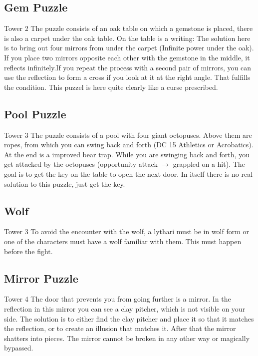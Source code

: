 \documentclass[a4paper,10pt,twoside,twocolumn,bg=print]{dndbook} %
\begin{document}
		\subsection{Gem Puzzle}
			Tower 2\linebreak
			The puzzle consists of an oak table on which a gemstone is placed, there is also a carpet under the oak table. On the table is a writing:  The solution here is to bring out four mirrors from under the carpet (Infinite power under the oak). If you place two mirrors opposite each other with the gemstone in the middle, it reflects infinitely.If you repeat the process with a second pair of mirrors, you can use the reflection to form a cross if you look at it at the right angle. That fulfills the condition. This puzzel is here quite clearly like a curse prescribed.
		\subsection{Pool Puzzle}
			Tower 3\linebreak
			The puzzle consists of a pool with four giant octopuses. Above them are ropes, from which you can swing back and forth (DC 15 Athletics or Acrobatics). At the end is a improved bear trap. While you are swinging back and forth, you get attacked by the octopuses (opportunity attack $\rightarrow$ grappled on a hit). The goal is to get the key on the table to open the next door. In itself there is no real solution to this puzzle, just get the key.
		\subsection{Wolf}
			Tower 3\linebreak
			To avoid the encounter with the wolf, a lythari must be in wolf form or one of the characters must have a wolf familiar with them. This must happen before the fight.
		\subsection{Mirror Puzzle}
			Tower 4\linebreak
			The door that prevents you from going further is a mirror. In the reflection in this mirror you can see a clay pitcher, which is not visible on your side. The solution is to either find the clay pitcher and place it so that it matches the reflection, or to create an illusion that matches it. After that the mirror shatters into pieces. The mirror cannot be broken in any other way or magically bypassed.
	\vfill
	\pagebreak
\end{document}
